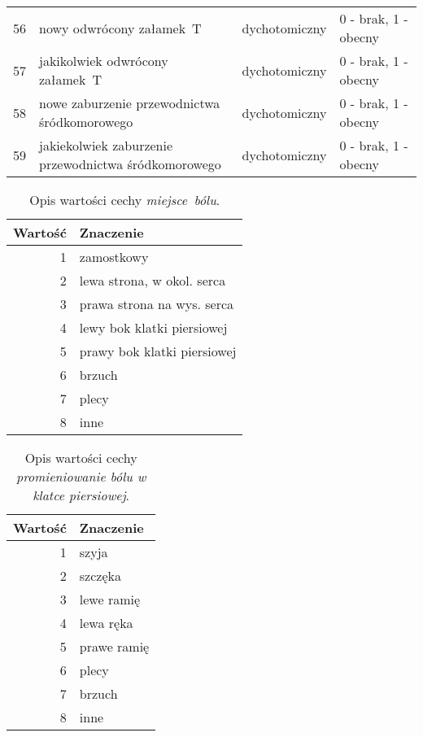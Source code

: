 \begin{longtabu}{rX[l]ll}
    56            & nowy odwrócony załamek~T                              & dychotomiczny        & 0 - brak, 1 - obecny      \\
    57            & jakikolwiek odwrócony załamek~T                       & dychotomiczny        & 0 - brak, 1 - obecny      \\
    58            & nowe zaburzenie przewodnictwa śródkomorowego          & dychotomiczny        & 0 - brak, 1 - obecny      \\
    59            & jakiekolwiek zaburzenie przewodnictwa śródkomorowego  & dychotomiczny        & 0 - brak, 1 - obecny      \\
    \bottomrule
\end{longtabu}

\begin{table}
    \caption{Opis wartości cechy \textit{miejsce~bólu}.}\label{tab:cecha_3}
    \begin{tabu}{rX[l]}
        \toprule
        \textbf{Wartość} & \textbf{Znaczenie}          \\
        \midrule

        1                & zamostkowy                  \\
        2                & lewa strona, w okol. serca  \\
        3                & prawa strona na wys. serca  \\
        4                & lewy bok klatki piersiowej  \\
        5                & prawy bok klatki piersiowej \\
        6                & brzuch                      \\
        7                & plecy                       \\
        8                & inne                        \\
        \bottomrule
    \end{tabu}
\end{table}

\begin{table}
    \caption{Opis wartości cechy \textit{promieniowanie bólu w klatce piersiowej}.}\label{tab:cecha_4}
    \begin{tabu}{rX[l]}
        \toprule
        \textbf{Wartość} & \textbf{Znaczenie} \\
        \midrule

        1                & szyja              \\
        2                & szczęka            \\
        3                & lewe ramię         \\
        4                & lewa ręka          \\
        5                & prawe ramię        \\
        6                & plecy              \\
        7                & brzuch             \\
        8                & inne               \\
        \bottomrule
    \end{tabu}
\end{table}

